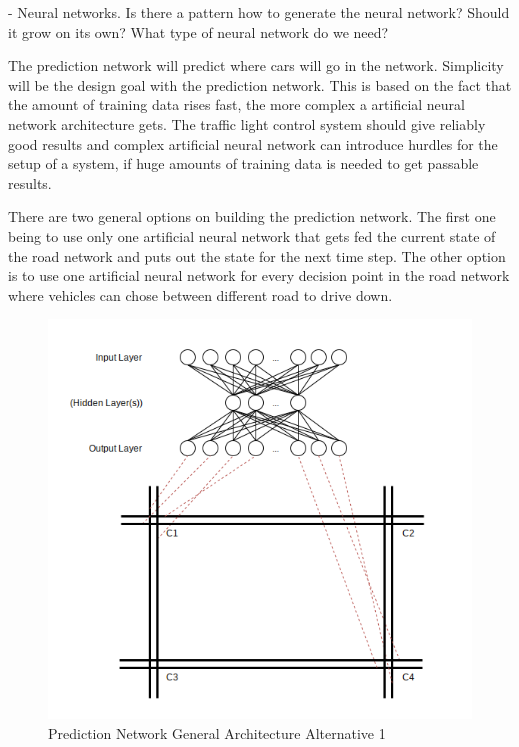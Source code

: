 - Neural networks. Is there a pattern how to  generate the neural network? Should it grow on its own? What type of neural network do we need?

The prediction network will predict where cars will go in the network. Simplicity will be the design goal with the prediction network. This is based on the fact that the amount of training data rises fast, the more complex a artificial neural network architecture gets. The traffic light control system should give reliably good results and complex artificial neural network can introduce hurdles for the setup of a system, if huge amounts of training data is needed to get passable results. 

There are two general options on building the prediction network. The first one being to use only one artificial neural network that gets fed the current state of the road network and puts out the state for the next time step. The other option is to use one artificial neural network for every decision point in the road network where vehicles can chose between different road to drive down.

\begin{figure}[!ht]
  \centering
  \includegraphics[width=16cm]{figures/predictionNetworkAlt1}
  \caption[Prediction Network General Architecture Alternative 1]{Prediction Network General Architecture Alternative 1 \protect\footnotemark}
  \label{predictionNetworkAlt1}
\end{figure}

